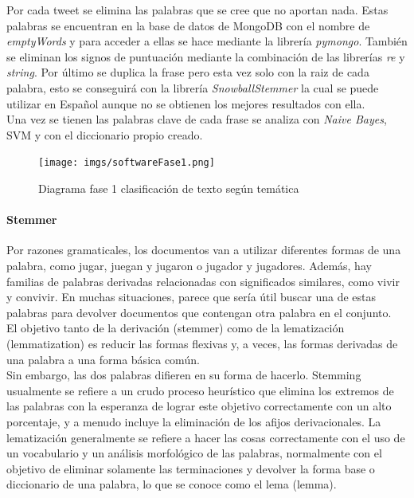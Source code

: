 \documentclass[../all.tex]{subfiles}
\begin{document}
    	Por cada tweet se elimina las palabras que se cree que no aportan nada. Estas palabras se encuentran en la base de datos de MongoDB con el nombre de \textit{emptyWords} y para acceder a ellas se hace mediante la librería \textit{pymongo}. También se eliminan los signos de puntuación mediante la combinación de las librerías \textit{re} y \textit{string}. Por último se duplica la frase pero esta vez solo con la raiz de cada palabra, esto se conseguirá con la librería \textit{SnowballStemmer} la cual se puede utilizar en Español aunque no se obtienen los mejores resultados con ella.\\
    	
    	Una vez se tienen las palabras clave de cada frase se analiza con \textit{Naive Bayes}, SVM y con el diccionario propio creado.
    	
        \begin{figure}[H]
        	\centering
        	\texttt{[image: imgs/softwareFase1.png]}
        	\caption{Diagrama fase 1 clasificación de texto según temática}
        \end{figure}
    
    	\newpage
        \paragraph{Stemmer}
        	Por razones gramaticales, los documentos van a utilizar diferentes formas de una palabra, como jugar, juegan y jugaron o jugador y jugadores. Además, hay familias de palabras derivadas relacionadas con significados similares, como vivir y convivir. En muchas situaciones, parece que sería útil buscar una de estas palabras para devolver documentos que contengan otra palabra en el conjunto.\\
        	
        	El objetivo tanto de la derivación (stemmer) como de la lematización (lemmatization) es reducir las formas flexivas y, a veces, las formas derivadas de una palabra a una forma básica común.\\
        	
        	Sin embargo, las dos palabras difieren en su forma de hacerlo. Stemming usualmente se refiere a un crudo proceso heurístico que elimina los extremos de las palabras con la esperanza de lograr este objetivo correctamente con un alto porcentaje, y a menudo incluye la eliminación de los afijos derivacionales. La lematización generalmente se refiere a hacer las cosas correctamente con el uso de un vocabulario y un análisis morfológico de las palabras, normalmente con el objetivo de eliminar solamente las terminaciones  y devolver la forma base o diccionario de una palabra, lo que se conoce como el lema (lemma).\\
        	
\end{document}
